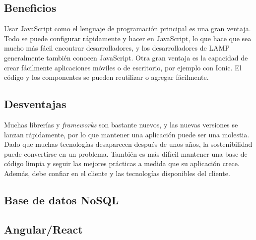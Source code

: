 \subsection{Beneficios}
Usar JavaScript como el lenguaje de programación principal es una gran ventaja. Todo se puede configurar rápidamente y hacer en JavaScript, lo que hace que sea mucho más fácil encontrar desarrolladores, y los desarrolladores de LAMP generalmente también conocen JavaScript. Otra gran ventaja es la capacidad de crear fácilmente aplicaciones móviles o de escritorio, por ejemplo con Ionic. El código y los componentes se pueden reutilizar o agregar fácilmente.

\subsection{Desventajas}
Muchas librerías y \textit{frameworks} son bastante nuevos, y las nuevas versiones se lanzan rápidamente, por lo que mantener una aplicación puede ser una molestia. Dado que muchas tecnologías desaparecen después de unos años, la sostenibilidad puede convertirse en un problema. También es más difícil mantener una base de código limpia y seguir las mejores prácticas a medida que su aplicación crece. Además, debe confiar en el cliente y las tecnologías disponibles del cliente.

\newpage
\subsection{Base de datos NoSQL}


\subsection{Angular/React}
